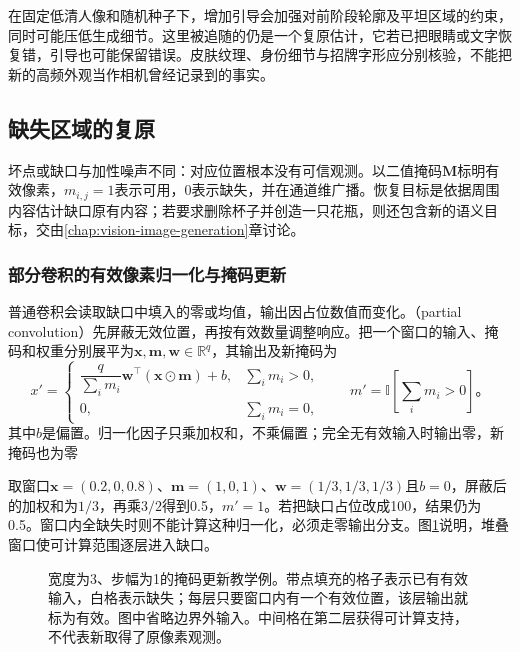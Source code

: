 在固定低清人像和随机种子下，增加引导会加强对前阶段轮廓及平坦区域的约束，同时可能压低生成细节。这里被追随的仍是一个复原估计，它若已把眼睛或文字恢复错，引导也可能保留错误。皮肤纹理、身份细节与招牌字形应分别核验，不能把新的高频外观当作相机曾经记录到的事实。

\subsection{缺失区域的复原}
\label{sec:vision-restoration-inpainting}

坏点或缺口与加性噪声不同：对应位置根本没有可信观测。以二值掩码$\bm{M}$标明有效像素，$m_{i,j}=1$表示可用，0表示缺失，并在通道维广播。恢复目标是依据周围内容估计缺口原有内容；若要求删除杯子并创造一只花瓶，则还包含新的语义目标，交由\ref{chap:vision-image-generation}章讨论。

\subsubsection{部分卷积的有效像素归一化与掩码更新}
\label{sec:vision-restoration-partial-convolution}

普通卷积会读取缺口中填入的零或均值，输出因占位数值而变化。（partial convolution）先屏蔽无效位置，再按有效数量调整响应。把一个窗口的输入、掩码和权重分别展平为$\bm{x},\bm{m},\bm{w}\in\mathbb{R}^q$，其输出及新掩码为
\begin{equation}
 x'=
 \begin{cases}
 \dfrac{q}{\sum_i m_i}\bm{w}^{\top}(\bm{x}\odot\bm{m})+b,
   &\sum_i m_i>0,\\
 0,&\sum_i m_i=0,
 \end{cases}
 \qquad
 m'=\mathbb{I}\!\left[\sum_i m_i>0\right]\text{。}
 \label{eq:vision-partial-convolution}
\end{equation}
其中$b$是偏置。归一化因子只乘加权和，不乘偏置；完全无有效输入时输出零，新掩码也为零

取窗口$\bm{x}=(0.2,0,0.8)$、$\bm{m}=(1,0,1)$、$\bm{w}=(1/3,1/3,1/3)$且$b=0$，屏蔽后的加权和为$1/3$，再乘$3/2$得到0.5，$m'=1$。若把缺口占位改成100，结果仍为0.5。窗口内全缺失时则不能计算这种归一化，必须走零输出分支。图\ref{fig:vision-partial-mask}说明，堆叠窗口使可计算范围逐层进入缺口。

\begin{figure}[htbp]
 \centering
 
 \caption{宽度为3、步幅为1的掩码更新教学例。带点填充的格子表示已有有效输入，白格表示缺失；每层只要窗口内有一个有效位置，该层输出就标为有效。图中省略边界外输入。中间格在第二层获得可计算支持，不代表新取得了原像素观测。}
 \label{fig:vision-partial-mask}
\end{figure}

